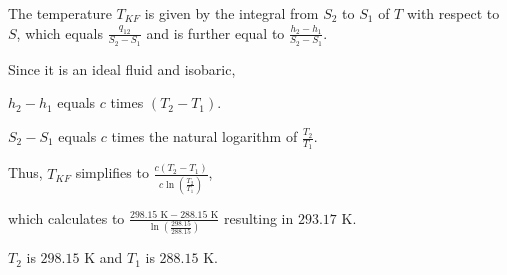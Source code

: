 The temperature \( T_{KF} \) is given by the integral from \( S_2 \) to \( S_1 \) of \( T \) with respect to \( S \), which equals \( \frac{q_{12}}{S_2 - S_1} \) and is further equal to \( \frac{h_2 - h_1}{S_2 - S_1} \).

Since it is an ideal fluid and isobaric,

\( h_2 - h_1 \) equals \( c \) times \( (T_2 - T_1) \).

\( S_2 - S_1 \) equals \( c \) times the natural logarithm of \( \frac{T_2}{T_1} \).

Thus, \( T_{KF} \) simplifies to \( \frac{c (T_2 - T_1)}{c \ln \left( \frac{T_2}{T_1} \right)} \),

which calculates to \( \frac{298.15 \text{ K} - 288.15 \text{ K}}{\ln \left( \frac{298.15}{288.15} \right)} \) resulting in \( 293.17 \text{ K} \).

\( T_2 \) is \( 298.15 \text{ K} \) and \( T_1 \) is \( 288.15 \text{ K} \).